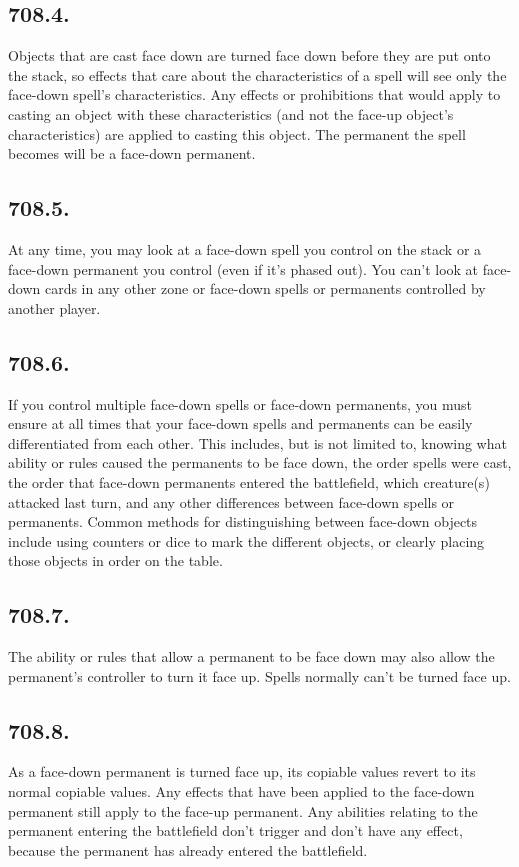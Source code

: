 \subsection*{708.4.}
Objects that are cast face down are turned face down before they are put onto the stack, so effects that care about the characteristics of a spell will see only the face-down spell’s characteristics. Any effects or prohibitions that would apply to casting an object with these characteristics (and not the face-up object’s characteristics) are applied to casting this object. The permanent the spell becomes will be a face-down permanent.

\subsection*{708.5.}
At any time, you may look at a face-down spell you control on the stack or a face-down permanent you control (even if it’s phased out). You can’t look at face-down cards in any other zone or face-down spells or permanents controlled by another player.

\subsection*{708.6.}
If you control multiple face-down spells or face-down permanents, you must ensure at all times that your face-down spells and permanents can be easily differentiated from each other. This includes, but is not limited to, knowing what ability or rules caused the permanents to be face down, the order spells were cast, the order that face-down permanents entered the battlefield, which creature(s) attacked last turn, and any other differences between face-down spells or permanents. Common methods for distinguishing between face-down objects include using counters or dice to mark the different objects, or clearly placing those objects in order on the table.

\subsection*{708.7.}
The ability or rules that allow a permanent to be face down may also allow the permanent’s controller to turn it face up. Spells normally can’t be turned face up.

\subsection*{708.8.}
As a face-down permanent is turned face up, its copiable values revert to its normal copiable values. Any effects that have been applied to the face-down permanent still apply to the face-up permanent. Any abilities relating to the permanent entering the battlefield don’t trigger and don’t have any effect, because the permanent has already entered the battlefield.

